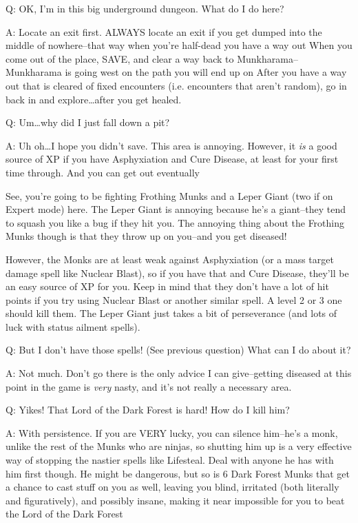 \documentclass[12pt]{article}
\begin{document}
Q: OK, I'm in this big underground dungeon. What do I do here?

A: Locate an exit first. ALWAYS locate an exit if you get dumped into
the middle of nowhere--that way when you're half-dead you have a way out
When you come out of the place, SAVE, and clear a way back to
Munkharama--Munkharama is going west on the path you will end up on
After you have a way out that is cleared of fixed encounters (i.e.
encounters that aren't random), go in back in and explore\ldots{}after
you get healed.

Q: Um\ldots{}why did I just fall down a pit?

A: Uh oh\ldots{}I hope you didn't save. This area is annoying. However,
it \emph{is} a good source of XP if you have Asphyxiation and Cure
Disease, at least for your first time through. And you can get out
eventually

See, you're going to be fighting Frothing Munks and a Leper Giant (two
if on Expert mode) here. The Leper Giant is annoying because he's a
giant--they tend to squash you like a bug if they hit you. The annoying
thing about the Frothing Munks though is that they throw up on you--and
you get diseased!

However, the Monks are at least weak against Asphyxiation (or a mass
target damage spell like Nuclear Blast), so if you have that and Cure
Disease, they'll be an easy source of XP for you. Keep in mind that they
don't have a lot of hit points if you try using Nuclear Blast or another
similar spell. A level 2 or 3 one should kill them. The Leper Giant just
takes a bit of perseverance (and lots of luck with status ailment
spells).

Q: But I don't have those spells! (See previous question) What can I do
about it?

A: Not much. Don't go there is the only advice I can give--getting
diseased at this point in the game is \emph{very} nasty, and it's not
really a necessary area.

Q: Yikes! That Lord of the Dark Forest is hard! How do I kill him?

A: With persistence. If you are VERY lucky, you can silence him--he's a
monk, unlike the rest of the Munks who are ninjas, so shutting him up is
a very effective way of stopping the nastier spells like Lifesteal. Deal
with anyone he has with him first though. He might be dangerous, but so
is 6 Dark Forest Munks that get a chance to cast stuff on you as well,
leaving you blind, irritated (both literally and figuratively), and
possibly insane, making it near impossible for you to beat the Lord of
the Dark Forest
\end{document}

